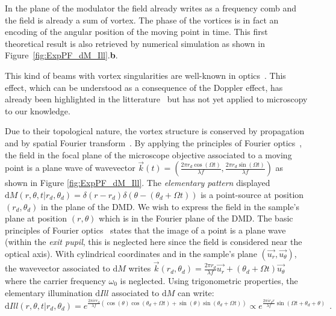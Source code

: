 \documentclass[%
reprint,
 amsmath,amssymb,
 aps,
]{revtex4-2}
\newcommand{\dd}{\mathrm{d}}
\begin{document}
In the plane of the modulator the field already writes as a frequency comb and the field is already a sum of vortex.  The phase of the vortices is in fact an encoding of the angular position of the moving point in time. This first theoretical result is also retrieved by numerical simulation as shown in Figure~\ref{fig:ExpPF_dM_Ill}.\textbf{b}.

This kind of beams with vortex singularities are well-known in optics~\cite{VorticesDennis}. This effect, which can be understood as a consequence of the Doppler effect, has already been highlighted in the litterature~\cite{RotFreqShiftPadgett, RotPropPiestun} but has not yet applied to microscopy to our knowledge. 

Due to their topological nature, the vortex structure is conserved by propagation and by spatial Fourier transform~\cite{InvariantBeams,OpticalVortices}.
By applying the principles of Fourier optics~\cite{FourierO}, the field in the focal plane of the microscope objective associated to a moving point is a plane wave of wavevector $\overrightarrow{k}(t)=\left(\frac{2\pi r_d \cos(\Omega t)}{\lambda f}, \frac{2\pi r_d \sin(\Omega t)}{\lambda f}\right)$ as shown in Figure \ref{fig:ExpPF_dM_Ill}.
The \textit{elementary pattern} displayed $\dd M(r,\theta,t | r_d,\theta_d)=\delta(r-r_d)\delta(\theta-(\theta_d+\Omega t))$ is a point-source at position $(r_d,\theta_d)$ in the plane of the DMD. We wish to express the field in the sample's plane at position $(r,\theta)$ which is in the Fourier plane of the DMD. The basic principles of Fourier optics~\cite{FourierO} states that the image of a point is a plane wave (within the \textit{exit pupil}, this is neglected here since the field is considered near the optical axis). With cylindrical coordinates and in the sample's plane $\left(\overrightarrow{u_r},\overrightarrow{u_\theta}\right)$, the wavevector associated to $\dd M$ writes $\overrightarrow{k}(r_d,\theta_d)= \frac{2 \pi r_d}{\lambda f} \overrightarrow{u_r} + (\theta_d+\Omega t )\overrightarrow{u_\theta} $ where the carrier frequency $\omega_0$ is neglected. Using trigonometric properties, the elementary illumination $\dd Ill$ associated to $\dd M$ can write:
\begin{equation} \label{eq:dIll}
    \dd Ill(r,\theta,t|r_d,\theta_d)=e^{\frac{2\pi i r r_d}{\lambda f}(\cos(\theta)\cos(\theta_d+\Omega t)+\sin(\theta)\sin(\theta_d+\Omega t))} \propto e^{\frac{2\pi i r_d r }{\lambda f}\sin(\Omega t+\theta_d+\theta)} \ \ .
\end{equation}
\end{document}
